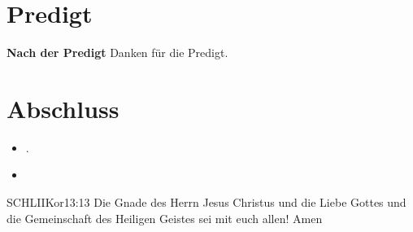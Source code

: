 \documentclass[fontsize=14pt]{mybib}
\begin{document}
\section{Predigt}
\textbf{Nach der Predigt}\newline
Danken für die Predigt.
\section{Abschluss}
\begin{itemize}
    \item [] .
    \item [] 
\end{itemize}
\begin{bibelbox}{SCHL}{IIKor}{13:13}
    Die Gnade des Herrn Jesus Christus und die Liebe Gottes und die Gemeinschaft des Heiligen Geistes sei mit euch allen! Amen
\end{bibelbox}
\end{document}
